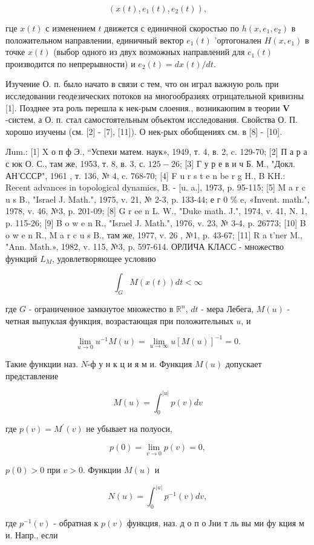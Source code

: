 \documentclass[10pt]{article}
\begin{document}
\[
\left(x(t), e_{1}(t), e_{2}(t)\right),
\]

гце $x(t)$ с изменением $t$ движется с единичной скоростью по $h\left(x, e_{1}, e_{2}\right)$ в положительном направлении, единичный вектор $e_{1}(t)$ 'ортогонален $H\left(x, e_{1}\right)$ в точке $x(t)$ (выбор одного из двух возможных направлений для $e_{1}(t)$ производится по непрерывности) и $e_{2}(t)=d x(t) / d t$.

Изучение О. п. было начато в связи с тем, что он играл важную роль при исследовании геодезических потоков на многообразиях отрицательной кривизны [1]. Позднее эта роль перешла к нек-рым слоения., возникаюпим в теории $\boldsymbol{V}$-систем, а О. п. стал самостоятельным объектом исследования. Свойства О. П. хорошо изучены (см. [2] - [7], [11]). О нек-рых обобщениях см. в [8] - [10].

Лum.: [1] X о п ф Э., “Успехи матем. наук», 1949, т. 4, в. 2, c. 129-70; [2] П а р а с юк О. С., там же, 1953, т. 8, в. 3, с. $125-26$; [3] Г у р е в и ч Б. М., "Докл. АН'СССР", 1961 , т. 136, № 4, c. 768-70; [4] F u r s t e n be r g H., B KH.: Recent advances in topological dynamics, B. - [u. a.], 1973, p. 95-115; [5] M a r c u s B., "Israel J. Math.", 1975, v. 21, № 2-3, p. 133-44; е г 0 \% e, «Invent. math.", 1978, v. 46, №3, p. 201-09; [8] G r ee n L. W., "Duke math. J.", 1974, v. 41, N. 1, p. 115-26; [9] B o w e n R., "Israel J. Math.", 1976, v. 23, № 3-4, p. 26773; [10] B o w e n R., M a r c u s B., там же, 1977, v. 26 , №1, p. 43-67; [11] R a t'ner M., "Ann. Math.», 1982, v. 115, №3,
p. 597-614. ОРЛИЧА КЛАСС - множество функций $L_{M}$, удовлетворяющее условию

\[
\int_{G} M(x(t)) d t<\infty
\]

где $G$ - ограниченное замкнутое множество в $\mathbb{R}^{n}$, $d t$ - мера Лебега, $M(u)$ - четная выпуклая функция, возрастающая при положительных $u$, и

\[
\lim _{u \rightarrow 0} u^{-1} M(u)=\lim _{u \rightarrow \infty} u[M(u)]^{-1}=0 .
\]

Такие функции наз. $N$-ф у н к ц и я м и. Функция $M(u)$ допускает представление

\[
M(u)=\int_{0}^{|u|} p(v) d v
\]

где $p(v)=M^{\prime}(v)$ не убывает на полуоси,

\[
p(0)=\lim _{v \rightarrow 0} p(v)=0,
\]

$p(0)>0$ при $v>0$. Функции $M(u)$ и

\[
N(u)=\int_{0}^{|u|} p^{-1}(v) d v,
\]

где $p^{-1}(v)$ - обратная к $p(v)$ функция, наз. д о п о Јни т ль вы ми фу кция м и. Напр., если
\end{document}
